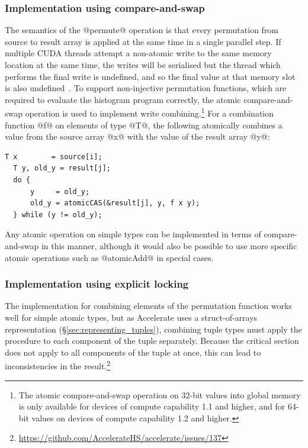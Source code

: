 \subsubsection{Implementation using compare-and-swap}

The semantics of the @permute@ operation is that every permutation from source to result
array is applied at the same time in a single parallel step. If multiple
CUDA\cuda{} threads attempt a non-atomic write to the same memory location at
the same time, the writes will be serialised but the thread which performs the
final write is undefined, and so the final value at that memory slot is also
undefined~\cite{NVIDIA:2012wf}. To support non-injective permutation functions,
which are required to evaluate the histogram program correctly, the atomic
compare-and-swap operation is used to implement write combining.\footnote{The
atomic compare-and-swap operation on 32-bit values into global memory is only
available for devices of compute capability 1.1 and higher, and for 64-bit
values on devices of compute capability 1.2 and higher.} For a combination
function @f@ on elements of type @T@, the following atomically combines a value
from the source array @x@ with the value of the result array @y@:

\begin{lstlisting}[style=cuda]
  T x        = source[i];
  T y, old_y = result[j];
  do {
      y     = old_y;
      old_y = atomicCAS(&result[j], y, f x y);
  } while (y != old_y);
\end{lstlisting}
%
Any atomic operation on simple types can be implemented in terms of
compare-and-swap in this manner, although it would also be possible to use more
specific atomic operations such as @atomicAdd@\cuda{} in special cases.


\subsubsection{Implementation using explicit locking}

The implementation for combining elements of the permutation function works well
for simple atomic types, but as Accelerate uses a struct-of-arrays
representation (\S\ref{sec:representing_tuples}), combining tuple types must
apply the procedure to each component of the tuple separately. Because the
critical section does not apply to all components of the tuple at once, this can
lead to inconsistencies in the
result.\footnote{\url{https://github.com/AccelerateHS/accelerate/issues/137}}

